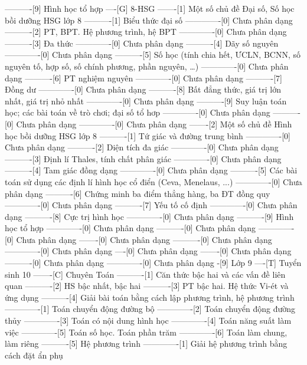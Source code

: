 ----------[9] Hình học tổ hợp
----[G] 8-HSG
-------[1] Một số chủ đề Đại số, Số học bồi dưỡng HSG lớp 8
----------[1] Biểu thức đại số
-------------[0] Chưa phân dạng
----------[2] PT, BPT. Hệ phương trình, hệ BPT
-------------[0] Chưa phân dạng
----------[3] Đa thức
-------------[0] Chưa phân dạng
----------[4] Dãy số nguyên
-------------[0] Chưa phân dạng
----------[5] Số học (tính chia hết, ƯCLN, BCNN, số nguyên tố, hợp số, số chính phương, phần nguyên, \ldots)
-------------[0] Chưa phân dạng
----------[6] PT nghiệm nguyên
-------------[0] Chưa phân dạng
----------[7] Đồng dư
-------------[0] Chưa phân dạng
----------[8] Bất đẳng thức, giá trị lớn nhất, giá trị nhỏ nhất
-------------[0] Chưa phân dạng
----------[9] Suy luận toán học; các bài toán về trò chơi; đại số tổ hơp
-------------[0] Chưa phân dạng
----------[0] Chưa phân dạng
-------------[0] Chưa phân dạng
-------[2] Một số chủ đề Hình học bồi dưỡng HSG lớp 8
----------[1] Tứ giác và đường trung bình
-------------[0] Chưa phân dạng
----------[2] Diện tích đa giác
-------------[0] Chưa phân dạng
----------[3] Định lí Thales, tính chất phân giác
-------------[0] Chưa phân dạng
----------[4] Tam giác đồng dạng
-------------[0] Chưa phân dạng
----------[5] Các bài toán sử dụng các định lí hình học cổ điển (Ceva, Menelaus, ...)
-------------[0] Chưa phân dạng
----------[6] Chứng minh ba điểm thẳng hàng, ba ĐT đồng quy
-------------[0] Chưa phân dạng
----------[7] Yếu tố cố định
-------------[0] Chưa phân dạng
----------[8] Cực trị hình học
-------------[0] Chưa phân dạng
----------[9] Hình học tổ hợp
-------------[0] Chưa phân dạng
----------[0] Chưa phân dạng
-------------[0] Chưa phân dạng
-------[0] Chưa phân dạng
----------[0] Chưa phân dạng
-------------[0] Chưa phân dạng
----[0] Chưa phân dạng
-------[0] Chưa phân dạng
----------[0] Chưa phân dạng
-------------[0] Chưa phân dạng
-[9] Lớp 9
----[T] Tuyển sinh 10
-------[C] Chuyên Toán
----------[1] Căn thức bậc hai và các vấn đề liên quan
----------[2] HS bậc nhất, bậc hai
----------[3] PT bậc hai. Hệ thức Vi-ét và ứng dụng
----------[4] Giải bài toán bằng cách lập phương trình, hệ phương trình
-------------[1] Toán chuyển động đường bộ
-------------[2] Toán chuyển động đường thủy
-------------[3] Toán có nội dung hình học
-------------[4] Toán năng suất làm việc
-------------[5] Toán số học. Toán phần trăm
-------------[6] Toán làm chung, làm riêng
----------[5] Hệ phương trình
-------------[1] Giải hệ phương trình bằng cách đặt ẩn phụ
